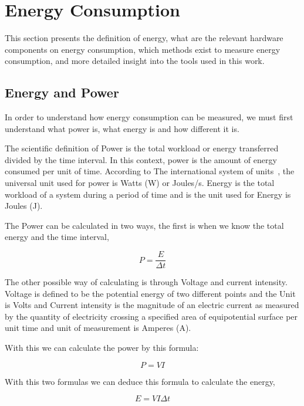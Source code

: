 \section{Energy Consumption}
This section presents the definition of energy, what are the relevant hardware components on energy consumption, which methods exist to measure energy consumption, and more detailed insight into the tools used in this work.

\subsection{Energy and Power} \label{energypower} 
In order to understand how energy consumption can be measured, we must first understand what power is, what energy is and how different it is.

The scientific definition of Power is the total workload or energy transferred divided by the time interval. In this context, power is the amount of energy consumed per unit of time. According to The international system of units~\cite{taylor_1991}, the universal unit used for power is Watts (W) or Joules/s. Energy is the total workload of a system during a period of time and is the unit used for Energy is Joules (J).

The Power can be calculated in two ways, the first is when we know the total energy and the time interval,

\begin{equation}
P = \frac{E}{\Delta t} 
\end{equation}

The other possible way of calculating is through Voltage and current intensity. Voltage is defined to be the potential energy of two different points and the Unit is Volts and Current intensity is the magnitude of an electric current as measured by the quantity of electricity crossing a specified area of equipotential surface per unit time and unit of measurement is Amperes (A). 

With this we can calculate the power by this formula:

\begin{equation}\label{eq:pvi}
P = V I
\end{equation}

With this two formulas we can deduce this formula to calculate the energy,

\begin{equation}\label{eq:energyfinal}
E = V I \Delta t
\end{equation}

